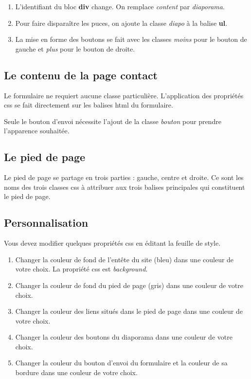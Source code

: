 \documentclass[11pt]{article}
\providecommand{\tightlist}{%
      \setlength{\itemsep}{0pt}\setlength{\parskip}{0pt}}
\begin{document}
\begin{enumerate}
\def\labelenumi{\arabic{enumi}.}
\tightlist
\item
  L'identifiant du bloc \textbf{div} change. On remplace \emph{content}
  par \emph{diaporama}.
\item
  Pour faire disparaître les puces, on ajoute la classe \emph{diapo} à
  la balise \textbf{ul}.
\item
  La mise en forme des boutons se fait avec les classes \emph{moins}
  pour le bouton de gauche et \emph{plus} pour le bouton de droite.
\end{enumerate}

\hypertarget{le-contenu-de-la-page-contact}{%
\subsection{Le contenu de la page
contact}\label{le-contenu-de-la-page-contact}}

Le formulaire ne requiert aucune classe particulière. L'application des
propriétés css se fait directement sur les balises html du formulaire.

Seule le bouton d'envoi nécessite l'ajout de la classe \emph{bouton}
pour prendre l'apparence souhaitée.

\hypertarget{le-pied-de-page}{%
\subsection{Le pied de page}\label{le-pied-de-page}}

Le pied de page se partage en trois parties : gauche, centre et droite.
Ce sont les noms des trois classes css à attribuer aux trois balises
principales qui constituent le pied de page.

\hypertarget{personnalisation}{%
\subsection{Personnalisation}\label{personnalisation}}

Vous devez modifier quelques propriétés css en éditant la feuille de
style.

\begin{enumerate}
\def\labelenumi{\arabic{enumi}.}
\tightlist
\item
  Changer la couleur de fond de l'entête du site (bleu) dans une couleur
  de votre choix. La propriété css est \emph{background}.
\item
  Changer la couleur de fond du pied de page (gris) dans une couleur de
  votre choix.
\item
  Changer la couleur des liens situés dans le pied de page dans une
  couleur de votre choix.
\item
  Changer la couleur des boutons du diaporama dans une couleur de votre
  choix.
\item
  Changer la couleur du bouton d'envoi du formulaire et la couleur de sa
  bordure dans une couleur de votre choix.
\end{enumerate}
\end{document}

